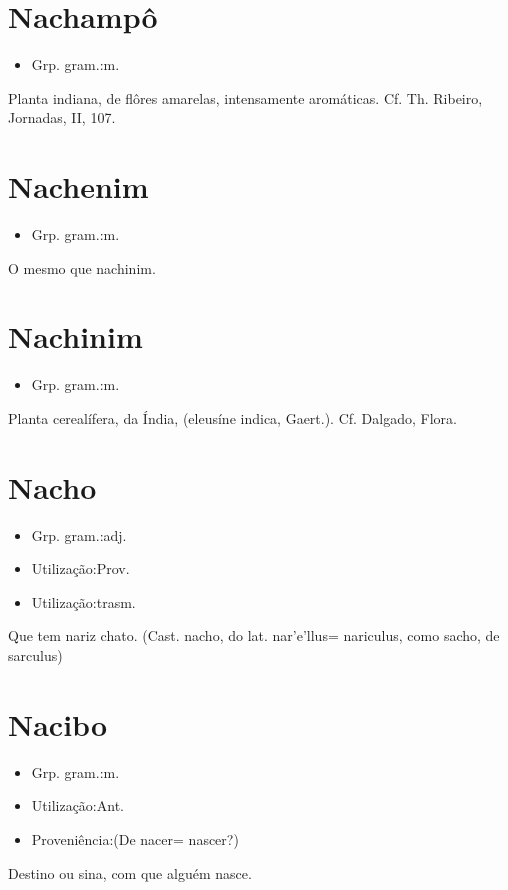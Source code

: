 \section{Nachampô}
\begin{itemize}
\item {Grp. gram.:m.}
\end{itemize}
Planta indiana, de flôres amarelas, intensamente aromáticas. Cf. Th. Ribeiro, \textunderscore Jornadas\textunderscore , II, 107.
\section{Nachenim}
\begin{itemize}
\item {Grp. gram.:m.}
\end{itemize}
O mesmo que \textunderscore nachinim\textunderscore .
\section{Nachinim}
\begin{itemize}
\item {Grp. gram.:m.}
\end{itemize}
Planta cerealífera, da Índia, (\textunderscore eleusíne indica\textunderscore , Gaert.). Cf. Dalgado, \textunderscore Flora\textunderscore .
\section{Nacho}
\begin{itemize}
\item {Grp. gram.:adj.}
\end{itemize}
\begin{itemize}
\item {Utilização:Prov.}
\end{itemize}
\begin{itemize}
\item {Utilização:trasm.}
\end{itemize}
Que tem nariz chato.
(Cast. \textunderscore nacho\textunderscore , do lat. \textunderscore nar'e'llus\textunderscore  = \textunderscore nariculus\textunderscore , como \textunderscore sacho\textunderscore , de \textunderscore sarculus\textunderscore )
\section{Nacibo}
\begin{itemize}
\item {Grp. gram.:m.}
\end{itemize}
\begin{itemize}
\item {Utilização:Ant.}
\end{itemize}
\begin{itemize}
\item {Proveniência:(De \textunderscore nacer\textunderscore  = \textunderscore nascer\textunderscore ?)}
\end{itemize}
Destino ou sina, com que alguém nasce.

